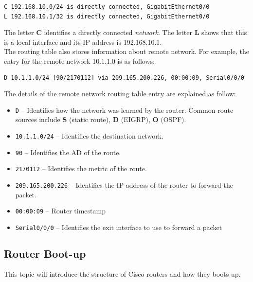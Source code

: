 {\begin{verbatim}
C 192.168.10.0/24 is directly connected, GigabitEthernet0/0
L 192.168.10.1/32 is directly connected, GigabitEthernet0/0
\end{verbatim}

The letter \textbf{C} identifies a directly connected \emph{network}. The letter \textbf{L} shows that this is a local interface and its IP address is 192.168.10.1.\\

The routing table also stores information about remote network. For example, the entry for the remote network 10.1.1.0 is as follows:

\begin{verbatim}
D 10.1.1.0/24 [90/2170112] via 209.165.200.226, 00:00:09, Serial0/0/0
\end{verbatim}

The details of the remote network routing table entry are explained as follow:

\begin{itemize}
\item \verb|D| -- Identifies how the network was learned by the router. Common  route sources include \textbf{S} (static route), \textbf{D} (EIGRP), \textbf{O} (OSPF).

\item \verb|10.1.1.0/24| -- Identifies the destination network.

\item \verb|90| -- Identifies the AD of the route.

\item \verb|2170112| -- Identifies the metric of the route.

\item \verb|209.165.200.226| -- Identifies the IP address of the router to forward the packet.

\item \verb|00:00:09| -- Router timestamp

\item \verb|Serial0/0/0| -- Identifies the exit interface to use to forward a packet
\end{itemize}

\subsection{Router Boot-up}

This topic will introduce the structure of Cisco routers and how they boots up.\\

}
